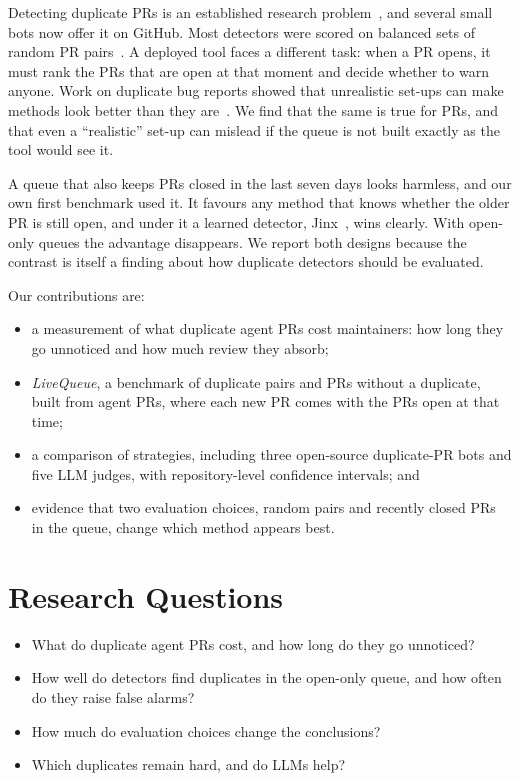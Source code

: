 \documentclass[10pt,conference]{IEEEtran}
\begin{document}
Detecting duplicate PRs is an established research problem~\cite{li2017detecting,ren2019intrude,wang2019time,jiang2023duphunter,liao2024dupllm,galbraith2025duplicate}, and several small bots now offer it on GitHub. Most detectors were scored on balanced sets of random PR pairs~\cite{ren2019intrude}. A deployed tool faces a different task: when a PR opens, it must rank the PRs that are open at that moment and decide whether to warn anyone. Work on duplicate bug reports showed that unrealistic set-ups can make methods look better than they are~\cite{zhang2023howfar}. We find that the same is true for PRs, and that even a ``realistic'' set-up can mislead if the queue is not built exactly as the tool would see it.

A queue that also keeps PRs closed in the last seven days looks harmless, and our own first benchmark used it. It favours any method that knows whether the older PR is still open, and under it a learned detector, Jinx~\cite{jinxtool}, wins clearly. With open-only queues the advantage disappears. We report both designs because the contrast is itself a finding about how duplicate detectors should be evaluated.

Our contributions are:
\begin{itemize}
\item a measurement of what duplicate agent PRs cost maintainers: how long they go unnoticed and how much review they absorb;
\item \emph{LiveQueue}, a benchmark of \nPairs{} duplicate pairs and \nNeg{} PRs without a duplicate, built from \nPRs{} agent PRs, where each new PR comes with the PRs open at that time;
\item a comparison of \nStrategies{} strategies, including three open-source duplicate-PR bots and five LLM judges, with repository-level confidence intervals; and
\item evidence that two evaluation choices, random pairs and recently closed PRs in the queue, change which method appears best.
\end{itemize}

\section{Research Questions}
\begin{itemize}
\item[\textbf{RQ1}] What do duplicate agent PRs cost, and how long do they go unnoticed?
\item[\textbf{RQ2}] How well do detectors find duplicates in the open-only queue, and how often do they raise false alarms?
\item[\textbf{RQ3}] How much do evaluation choices change the conclusions?
\item[\textbf{RQ4}] Which duplicates remain hard, and do LLMs help?
\end{itemize}
\end{document}
